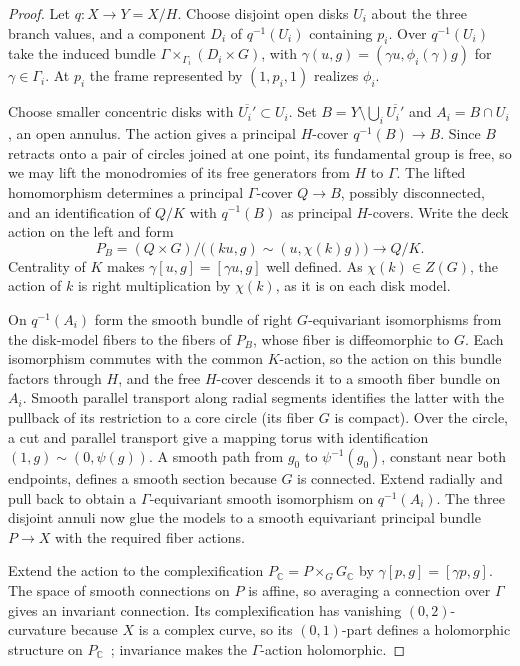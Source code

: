 \documentclass[11pt,a4paper,reqno]{amsart}
\theoremstyle{plain}
\theoremstyle{definition}
\theoremstyle{remark}
\numberwithin{equation}{section}
\newcommand{\CC}{\mathbb C}
\begin{document}
\begin{proof}
Let $q\colon X\to Y=X/H$. Choose disjoint open disks $U_i$ about the three branch values, and a component $D_i$ of $q^{-1}(U_i)$ containing $p_i$. Over $q^{-1}(U_i)$ take the induced bundle $\Gamma\times_{\Gamma_i}(D_i\times G)$, with $\gamma(u,g)=(\gamma u,\phi_i(\gamma)g)$ for $\gamma\in\Gamma_i$. At $p_i$ the frame represented by $(1,p_i,1)$ realizes $\phi_i$.

Choose smaller concentric disks with $\overline{U_i'}\subset U_i$. Set $B=Y\setminus\bigcup_i\overline{U_i'}$ and $A_i=B\cap U_i$, an open annulus. The action gives a principal $H$-cover $q^{-1}(B)\to B$. Since $B$ retracts onto a pair of circles joined at one point, its fundamental group is free, so we may lift the monodromies of its free generators from $H$ to $\Gamma$. The lifted homomorphism determines a principal $\Gamma$-cover $Q\to B$, possibly disconnected, and an identification of $Q/K$ with $q^{-1}(B)$ as principal $H$-covers. Write the deck action on the left and form
\[
P_B=(Q\times G)/\bigl((ku,g)\sim(u,\chi(k)g)\bigr)\longrightarrow Q/K.
\]
Centrality of $K$ makes $\gamma[u,g]=[\gamma u,g]$ well defined. As $\chi(k)\in Z(G)$, the action of $k$ is right multiplication by $\chi(k)$, as it is on each disk model.

On $q^{-1}(A_i)$ form the smooth bundle of right $G$-equivariant isomorphisms from the disk-model fibers to the fibers of $P_B$, whose fiber is diffeomorphic to $G$. Each isomorphism commutes with the common $K$-action, so the action on this bundle factors through $H$, and the free $H$-cover descends it to a smooth fiber bundle on $A_i$. Smooth parallel transport along radial segments identifies the latter with the pullback of its restriction to a core circle (its fiber $G$ is compact). Over the circle, a cut and parallel transport give a mapping torus with identification $(1,g)\sim(0,\psi(g))$. A smooth path from $g_0$ to $\psi^{-1}(g_0)$, constant near both endpoints, defines a smooth section because $G$ is connected. Extend radially and pull back to obtain a $\Gamma$-equivariant smooth isomorphism on $q^{-1}(A_i)$. The three disjoint annuli now glue the models to a smooth equivariant principal bundle $P\to X$ with the required fiber actions.

Extend the action to the complexification $P_{\CC}=P\times_G G_{\CC}$ by $\gamma[p,g]=[\gamma p,g]$. The space of smooth connections on $P$ is affine, so averaging a connection over $\Gamma$ gives an invariant connection. Its complexification has vanishing $(0,2)$-curvature because $X$ is a complex curve, so its $(0,1)$-part defines a holomorphic structure on $P_{\CC}$~\cite[Lemmas~2.4--2.5]{Trautwein}; invariance makes the $\Gamma$-action holomorphic.

\end{proof}
\end{document}
